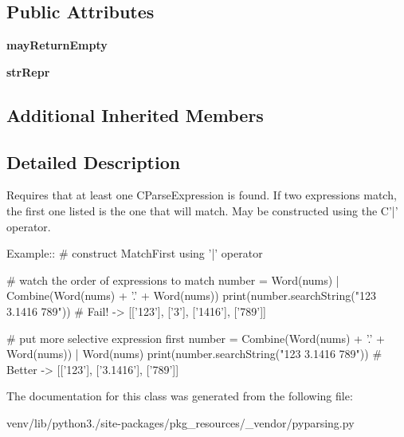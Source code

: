 \subsection*{Public Attributes}
\begin{DoxyCompactItemize}
\item 
\mbox{\label{classpkg__resources_1_1__vendor_1_1pyparsing_1_1_match_first_a9ab2320992630796ee7fdda75dbaeeeb}} 
{\bfseries may\+Return\+Empty}
\item 
\mbox{\label{classpkg__resources_1_1__vendor_1_1pyparsing_1_1_match_first_ad83e15622522a01209dc770db5fe54e6}} 
{\bfseries str\+Repr}
\end{DoxyCompactItemize}
\subsection*{Additional Inherited Members}


\subsection{Detailed Description}
\begin{DoxyVerb}Requires that at least one C{ParseExpression} is found.
If two expressions match, the first one listed is the one that will match.
May be constructed using the C{'|'} operator.

Example::
    # construct MatchFirst using '|' operator
    
    # watch the order of expressions to match
    number = Word(nums) | Combine(Word(nums) + '.' + Word(nums))
    print(number.searchString("123 3.1416 789")) #  Fail! -> [['123'], ['3'], ['1416'], ['789']]

    # put more selective expression first
    number = Combine(Word(nums) + '.' + Word(nums)) | Word(nums)
    print(number.searchString("123 3.1416 789")) #  Better -> [['123'], ['3.1416'], ['789']]
\end{DoxyVerb}
 

The documentation for this class was generated from the following file\+:\begin{DoxyCompactItemize}
\item 
venv/lib/python3./site-\/packages/pkg\+\_\+resources/\+\_\+vendor/pyparsing.\+py\end{DoxyCompactItemize}
